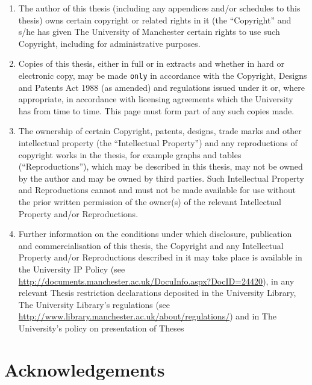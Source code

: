\begin{enumerate}
    \item The author of this thesis (including any appendices and/or schedules
        to this thesis) owns certain copyright or related rights in it (the
        ``Copyright'' and s/he has given The University of Manchester certain rights to use such Copyright, including for administrative purposes.

    \item Copies of this thesis, either in full or in extracts and whether in
    hard or electronic copy, may be made \texttt{only} in accordance with the Copyright, Designs and Patents Act 1988 (as amended) and regulations issued under it or, where appropriate, in accordance with licensing agreements which the University has from time to time. This page must form part of any such copies made.

    \item The ownership of certain Copyright, patents, designs, trade marks
        and other intellectual property (the ``Intellectual Property'') and any
        reproductions of copyright works in the thesis, for example graphs and
        tables (``Reproductions''), which may be described in this thesis, may not be owned by the author and may be owned by third parties. Such Intellectual Property and Reproductions cannot and must not be made available for use without the prior written permission of the owner(s) of the relevant Intellectual Property and/or Reproductions.

    \item Further information on the conditions under which disclosure,
        publication and commercialisation of this thesis, the Copyright and any
        Intellectual Property and/or Reproductions described in it may take
        place is available in the University IP Policy (see
        \href{http://documents.manchester.ac.uk/DocuInfo.aspx?DocID=24420}{\url{http://documents.manchester.ac.uk/DocuInfo.aspx?DocID=24420}}),
        in any relevant Thesis restriction declarations deposited in the
        University Library, The University Library’s regulations (see
        \href{http://www.library.manchester.ac.uk/about/regulations/}{\url{http://www.library.manchester.ac.uk/about/regulations/}}) and in The University’s policy on presentation of Theses
\end{enumerate}

\clearpage

\section*{Acknowledgements}

